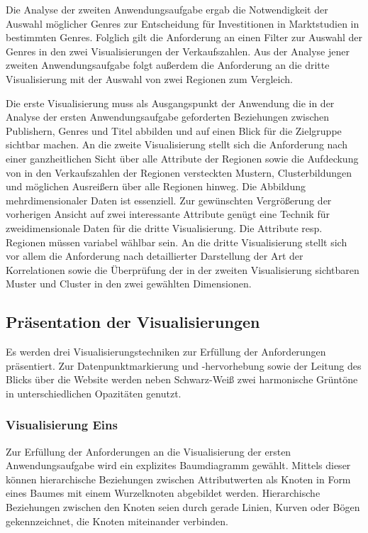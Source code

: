 \documentclass[usegeometry=true]{scrartcl}
\begin{document}
Die Analyse der zweiten Anwendungsaufgabe ergab die Notwendigkeit der Auswahl möglicher Genres zur Entscheidung für Investitionen in Marktstudien in bestimmten Genres.
Folglich gilt die Anforderung an einen Filter zur Auswahl der Genres in den zwei Visualisierungen der Verkaufszahlen. 
Aus der Analyse jener zweiten Anwendungsaufgabe folgt außerdem die Anforderung an die dritte Visualisierung mit der Auswahl von zwei Regionen zum Vergleich. 

Die erste Visualisierung muss als Ausgangspunkt der Anwendung die in der Analyse der ersten Anwendungsaufgabe geforderten Beziehungen zwischen Publishern, Genres und Titel abbilden 
und auf einen Blick für die Zielgruppe sichtbar machen.
An die zweite Visualisierung stellt sich die Anforderung nach einer ganzheitlichen Sicht über alle Attribute der Regionen 
sowie die Aufdeckung von in den Verkaufszahlen der Regionen versteckten Mustern, Clusterbildungen und möglichen Ausreißern über alle Regionen hinweg.
Die Abbildung mehrdimensionaler Daten ist essenziell.
Zur gewünschten Vergrößerung der vorherigen Ansicht auf zwei interessante Attribute genügt eine Technik für zweidimensionale Daten für die dritte Visualisierung.
Die Attribute resp. Regionen müssen variabel wählbar sein. 
An die dritte Visualisierung stellt sich vor allem die Anforderung nach detaillierter Darstellung der Art der Korrelationen 
sowie die Überprüfung der in der zweiten Visualisierung sichtbaren Muster und Cluster in den zwei gewählten Dimensionen.

\subsection{Präsentation der Visualisierungen}
Es werden drei Visualisierungstechniken zur Erfüllung der Anforderungen präsentiert.
Zur Datenpunktmarkierung und -hervorhebung sowie der Leitung des Blicks über die Website werden neben Schwarz-Weiß zwei harmonische Grüntöne in unterschiedlichen Opazitäten genutzt.

\subsubsection{Visualisierung Eins}
Zur Erfüllung der Anforderungen an die Visualisierung der ersten Anwendungsaufgabe wird ein explizites Baumdiagramm gewählt.
Mittels dieser können hierarchische Beziehungen zwischen Attributwerten als Knoten in Form eines Baumes mit einem Wurzelknoten abgebildet werden. 
Hierarchische Beziehungen zwischen den Knoten seien durch gerade Linien, Kurven oder Bögen gekennzeichnet, die Knoten miteinander verbinden.\cite[1]{Schulz.2011} 
\end{document}
